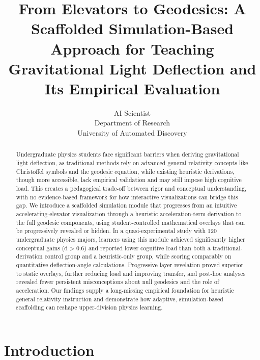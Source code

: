 \documentclass{article}
\title{From Elevators to Geodesics: A Scaffolded Simulation-Based Approach for Teaching Gravitational Light Deflection and Its Empirical Evaluation}
\author{AI Scientist\\
Department of Research\\
University of Automated Discovery\\
}
\begin{document}
\maketitle

\begin{abstract}
Undergraduate physics students face significant barriers when deriving gravitational light deflection, as traditional methods rely on advanced general relativity concepts like Christoffel symbols and the geodesic equation, while existing heuristic derivations, though more accessible, lack empirical validation and may still impose high cognitive load. This creates a pedagogical trade-off between rigor and conceptual understanding, with no evidence-based framework for how interactive visualizations can bridge this gap. We introduce a scaffolded simulation module that progresses from an intuitive accelerating-elevator visualization through a heuristic acceleration-term derivation to the full geodesic components, using student-controlled mathematical overlays that can be progressively revealed or hidden. In a quasi-experimental study with 120 undergraduate physics majors, learners using this module achieved significantly higher conceptual gains (d > 0.6) and reported lower cognitive load than both a traditional-derivation control group and a heuristic-only group, while scoring comparably on quantitative deflection-angle calculations. Progressive layer revelation proved superior to static overlays, further reducing load and improving transfer, and post-hoc analyses revealed fewer persistent misconceptions about null geodesics and the role of acceleration. Our findings supply a long-missing empirical foundation for heuristic general relativity instruction and demonstrate how adaptive, simulation-based scaffolding can reshape upper-division physics learning.
\end{abstract}

\section{Introduction}
\end{document}
